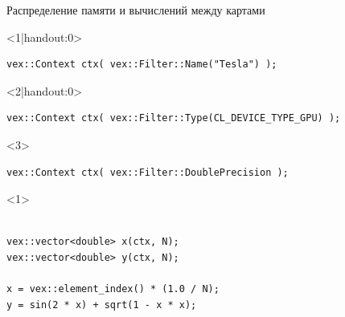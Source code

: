 \documentclass[@BEAMER_OPTIONS@]{beamer}
\begin{document}
\begin{frame}[fragile]{Распределение памяти и вычислений между картами}
    \begin{exampleblock}{}
        \begin{onlyenv}<1|handout:0>
        \begin{lstlisting}
vex::Context ctx( vex::Filter::Name("Tesla") );
        \end{lstlisting}
        \end{onlyenv}
        \begin{onlyenv}<2|handout:0>
        \begin{lstlisting}
vex::Context ctx( vex::Filter::Type(CL_DEVICE_TYPE_GPU) );
        \end{lstlisting}
        \end{onlyenv}
        \begin{onlyenv}<3>
        \begin{lstlisting}
vex::Context ctx( vex::Filter::DoublePrecision );
        \end{lstlisting}
        \end{onlyenv}
        \begin{uncoverenv}<1>
        \begin{lstlisting}[firstnumber=last]

vex::vector<double> x(ctx, N);
vex::vector<double> y(ctx, N);

x = vex::element_index() * (1.0 / N);
y = sin(2 * x) + sqrt(1 - x * x);
        \end{lstlisting}
        \end{uncoverenv}
    \end{exampleblock}
    \begin{figure}
\end{figure}
\end{frame}
\end{document}
